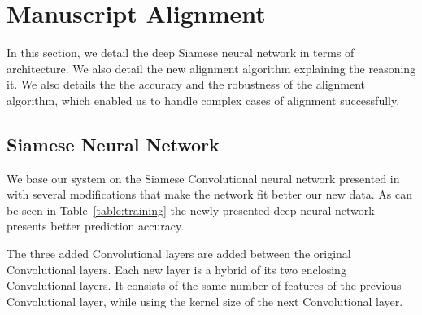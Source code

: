 \documentclass[10pt, a4paper, conference, compsocconf]{IEEEtran}
\begin{document}
\section{Manuscript Alignment}
In this section, we detail the deep Siamese neural network in terms of architecture. We also detail the new alignment algorithm explaining the reasoning it. We also details the the accuracy and the robustness of the alignment algorithm, which enabled us to handle complex cases of alignment successfully.

\subsection{Siamese Neural Network}
We base our system on the Siamese Convolutional neural network presented in~\cite{kassis2017siamese} with several modifications that make the network fit better our new data. As can be seen in Table~\ref{table:training} the newly presented deep neural network presents better prediction accuracy. 

The three added Convolutional layers are added between the original Convolutional layers. Each new layer is a hybrid of its two enclosing Convolutional layers. It consists of the same number of features of the previous Convolutional layer, while using the kernel size of the next Convolutional layer.
\end{document}
